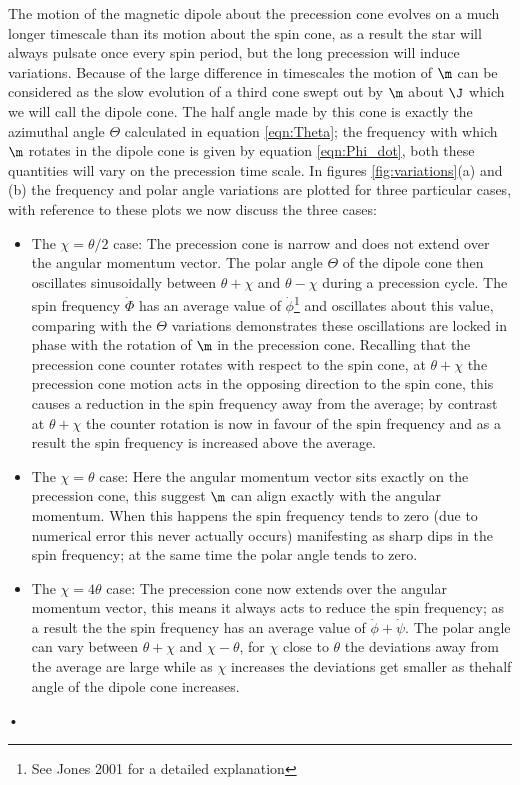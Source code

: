\documentclass[/home/greg/Thesis/main/main.tex]{subfiles}
\begin{document}
The motion of the magnetic dipole about the precession cone evolves on a much longer timescale than its motion about the spin cone, as a result the star will always pulsate once every spin period, but the long precession will induce variations.  Because of the large difference in timescales the motion of $\m$ can be considered as the slow evolution of a third cone swept out by $\m$ about $\J$ which we will call the dipole cone. The half angle made by this cone is exactly the azimuthal angle $\Theta$ calculated in equation \eqref{eqn:Theta}; the frequency with which $\m$ rotates in the dipole cone is given by equation \eqref{eqn:Phi_dot}, both these quantities will vary on the precession time scale. In figures \ref{fig:variations}(a) and (b) the frequency and polar angle variations are plotted for three particular cases, with reference to these plots we now discuss the three cases:
\begin{itemize}
\item The $\chi = \theta/2$ case: The precession cone is narrow and does not extend over the angular momentum vector. The polar angle $\Theta$ of the dipole cone then oscillates sinusoidally between $\theta+\chi$ and $\theta-\chi$ during a precession cycle. The spin frequency $\dot{\Phi}$ has an average value of $\dot{\phi}$\footnote{See Jones 2001 for a detailed explanation} and oscillates about this value, comparing with the $\Theta$ variations demonstrates these oscillations are locked in phase with the rotation of $\m$ in the precession cone. Recalling that the precession cone counter rotates with respect to the spin cone, at $\theta+\chi$ the precession cone motion acts in the opposing direction to the spin cone, this causes a reduction in the spin frequency away from the average; by contrast at $\theta+\chi$ the counter rotation is now in favour of the spin frequency and as a result the spin frequency is increased above the average.

\item The $\chi = \theta$ case: Here the angular momentum vector sits exactly on the precession cone, this suggest $\m$ can align exactly with the angular momentum. When this happens the spin frequency tends to zero (due to numerical error this never actually occurs) manifesting as sharp dips in the spin frequency; at the same time the polar angle tends to zero.

\item The $\chi = 4\theta$ case: The precession cone now extends over the angular momentum vector, this means it always acts to reduce the spin frequency; as a result the the spin frequency has an average value of $\dot{\phi} + \dot{\psi}$. The polar angle can vary between $\theta+\chi$ and $\chi-\theta$, for $\chi$ close to $\theta$ the deviations away from the average are large while as $\chi$ increases the deviations get smaller as thehalf angle of the dipole cone increases.
\end{itemize}•
\end{document}
